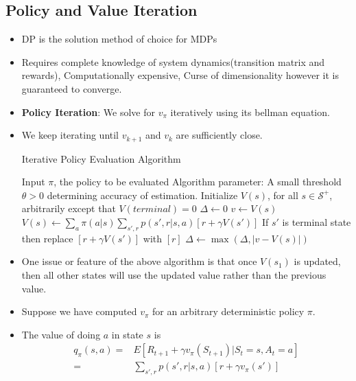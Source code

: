 \documentclass[a4paper]{article}
\begin{document}
\subsection{Policy and Value Iteration}
\begin{itemize}
    \item DP is the solution method of choice for MDPs
    \item Requires complete knowledge of system dynamics(transition matrix and rewards), Computationally expensive, Curse of dimensionality however it is guaranteed to converge.
    \item \textbf{Policy Iteration}: We solve for $v_\pi$ iteratively using its bellman equation.
    \item We keep iterating until $v_{k+1}$ and $v_{k}$ are sufficiently close.
    \begin{algorithm}[H]
        \caption{Iterative Policy Evaluation Algorithm}
        \begin{algorithmic}[1]
            \Statex Input $\pi$, the policy to be evaluated
            \Statex Algorithm parameter: A small threshold $\theta>0$ determining accuracy of estimation.
            \State Initialize $V(s)$, for all $s\in \mathcal{S}^+$, arbitrarily except that $V(terminal)=0$
            \Repeat
                \State $\Delta \gets 0$
                    \State $v\gets V(s)$
                    \State $V(s)\gets \sum_a\pi(a|s)\sum_{s',r}p(s',r|s,a)[r+\gamma V(s')]$
                    \LComment If $s'$ is terminal state then replace $[r+\gamma V(s')]$ with $[r]$
                    \State $\Delta \gets \max(\Delta,\lvert v-V(s)\rvert)$
                \EndFor
            \Until{$\Delta<\theta$}
        \end{algorithmic}
    \end{algorithm}
    \item One issue or feature of the above algorithm is that once $V(s_1)$ is updated, then all other states will use the updated value rather than the previous value.
    \item Suppose we have computed $v_\pi$ for an arbitrary deterministic policy $\pi$.
    \item The value of doing $a$ in state $s$ is
    \begin{equation*}
        \begin{split}
            q_\pi(s,a)=&E[R_{t+1}+\gamma v_\pi(S_{t+1})|S_t=s,A_t=a]\\
            =&\sum_{s',r}p(s',r|s,a)[r+\gamma v_\pi(s')]

\end{split}
\end{equation*}
\end{itemize}
\end{document}
